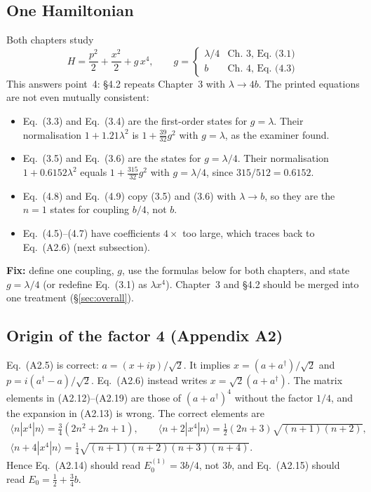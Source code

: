 \documentclass[11pt,a4paper]{article}
\newcommand{\Eq}[1]{Eq.~(#1)}
\newcommand{\ket}[1]{|#1\rangle}
\newcommand{\bra}[1]{\langle #1|}
\begin{document}
\subsection{One Hamiltonian}
Both chapters study
\begin{equation}
H=\frac{p^2}{2}+\frac{x^2}{2}+g\,x^4,\qquad
g=\begin{cases}\lambda/4&\text{Ch.~3, \Eq{3.1}}\\ b&\text{Ch.~4, \Eq{4.3}}\end{cases}
\label{eq:H}
\end{equation}
This answers point~4: \S4.2 repeats Chapter~3 with $\lambda\to4b$. The printed equations
are not even mutually consistent:
\begin{itemize}
\item \Eq{3.3} and \Eq{3.4} are the first-order states for $g=\lambda$. Their normalisation
  $1+1.21\lambda^2$ is $1+\tfrac{39}{32}g^2$ with $g=\lambda$, as the examiner found.
\item \Eq{3.5} and \Eq{3.6} are the states for $g=\lambda/4$. Their normalisation
  $1+0.6152\lambda^2$ equals $1+\tfrac{315}{32}g^2$ with $g=\lambda/4$, since
  $315/512=0.6152$.
\item \Eq{4.8} and \Eq{4.9} copy (3.5) and (3.6) with $\lambda\to b$, so they are the $n=1$
  states for coupling $b/4$, not $b$.
\item \Eq{4.5}--(4.7) have coefficients $4\times$ too large, which traces back to
  \Eq{A2.6} (next subsection).
\end{itemize}
\textbf{Fix:} define one coupling, $g$, use the formulas below for both chapters, and
state $g=\lambda/4$ (or redefine \Eq{3.1} as $\lambda x^4$). Chapter~3 and \S4.2 should be
merged into one treatment (\S\ref{sec:overall}).

\subsection{Origin of the factor 4 (Appendix A2)}
\Eq{A2.5} is correct: $a=(x+ip)/\sqrt2$. It implies $x=(a+a^\dagger)/\sqrt2$ and
$p=i(a^\dagger-a)/\sqrt2$. \Eq{A2.6} instead writes $x=\sqrt2(a+a^\dagger)$. The matrix
elements in (A2.12)--(A2.19) are those of $(a+a^\dagger)^4$ without the factor $1/4$, and the
expansion in (A2.13) is wrong. The correct elements are
\begin{gather}
\bra{n}x^4\ket{n}=\tfrac34(2n^2+2n+1),\qquad
\bra{n+2}x^4\ket{n}=\tfrac12(2n+3)\sqrt{(n+1)(n+2)},\nonumber\\
\bra{n+4}x^4\ket{n}=\tfrac14\sqrt{(n+1)(n+2)(n+3)(n+4)}.
\label{eq:x4}
\end{gather}
Hence \Eq{A2.14} should read $E_0^{(1)}=3b/4$, not $3b$, and \Eq{A2.15} should read
$E_0=\tfrac12+\tfrac34b$.
\end{document}
